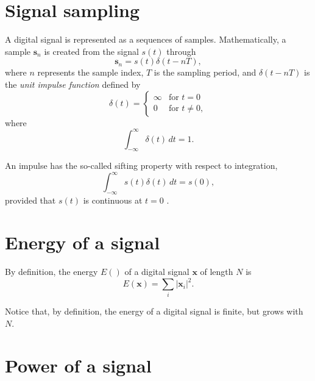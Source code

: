 
\section{Signal sampling}

A digital signal is represented as a sequences of
samples. Mathematically, a sample $\mathbf{s}_n$ is created from the
signal $s(t)$ through
\begin{equation}
  \mathbf{s}_n = s(t)\delta(t-nT),
\end{equation}
where $n$ represents the sample index, $T$ is the sampling period, and
$\delta(t-nT)$ is the \emph{unit impulse function} defined by
\begin{equation}
\delta(t) =
\begin{cases}
\infty & \text{for } t = 0 \\
0 & \text{for } t \neq 0,
\end{cases}
\end{equation}
where
\begin{equation}
\int_{-\infty}^{\infty} \delta(t) \, dt = 1.
\end{equation}

An impulse has the so-called sifting
property with respect to integration,
\begin{equation}
\int_{-\infty}^{\infty} s(t)\delta(t) \, dt = s(0),
\end{equation}
provided that $s(t)$ is continuous at $t=0$ \cite{gonzalez1992digital}.


\section{Energy of a signal}
\label{sec:energy_signal}

By definition, the energy $E()$ of a digital signal $\mathbf{x}$ of
length $N$ is
\begin{equation}
  E(\mathbf{x}) = \sum_{i}|\mathbf{x}_i|^2.
\end{equation}

Notice that, by definition, the energy of a digital signal is finite,
but grows with $N$.


\section{Power of a signal}
\label{sec:power_signal}

